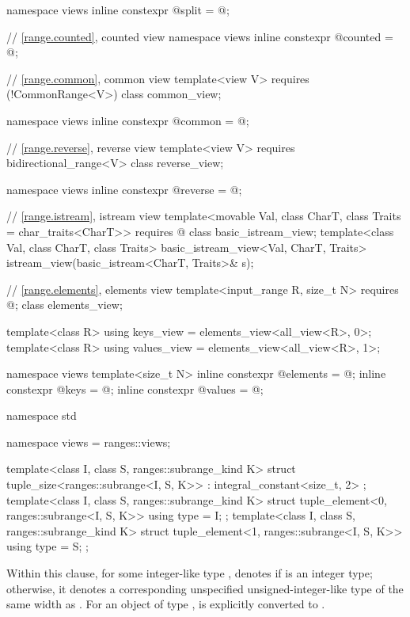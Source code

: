 \begin{codeblock}
{  namespace views { inline constexpr @\unspec@ split = @\unspec@; }

  // \ref{range.counted}, counted view
  namespace views { inline constexpr @\unspec@ counted = @\unspec@; }

  // \ref{range.common}, common view
  template<view V>
    requires (!CommonRange<V>)
  class common_view;

  namespace views { inline constexpr @\unspec@ common = @\unspec@; }

  // \ref{range.reverse}, reverse view
  template<view V>
    requires bidirectional_range<V>
  class reverse_view;

  namespace views { inline constexpr @\unspec@ reverse = @\unspec@; }

  // \ref{range.istream}, istream view
  template<movable Val, class CharT, class Traits = char_traits<CharT>>
    requires @\seebelow@
  class basic_istream_view;
  template<class Val, class CharT, class Traits>
    basic_istream_view<Val, CharT, Traits> istream_view(basic_istream<CharT, Traits>& s);

  // \ref{range.elements}, elements view
  template<input_range R, size_t N>
    requires @\seebelow@;
  class elements_view;

  template<class R>
    using keys_view = elements_view<all_view<R>, 0>;
  template<class R>
    using values_view = elements_view<all_view<R>, 1>;

  namespace views {
    template<size_t N>
      inline constexpr @\unspec@ elements = @\unspec@ ;
    inline constexpr @\unspec@ keys = @\unspec@ ;
    inline constexpr @\unspec@ values = @\unspec@ ;
  }
}

namespace std {
  namespace views = ranges::views;

  template<class I, class S, ranges::subrange_kind K>
  struct tuple_size<ranges::subrange<I, S, K>>
    : integral_constant<size_t, 2> {};
  template<class I, class S, ranges::subrange_kind K>
  struct tuple_element<0, ranges::subrange<I, S, K>> {
    using type = I;
  };
  template<class I, class S, ranges::subrange_kind K>
  struct tuple_element<1, ranges::subrange<I, S, K>> {
    using type = S;
  };
}
\end{codeblock}

\pnum
{}%
%
Within this clause,
for some integer-like type ,
 denotes
 if  is an integer type;
otherwise, it denotes a corresponding unspecified unsigned-integer-like type
of the same width as .
For an object  of type ,
 is
 explicitly converted to
.

